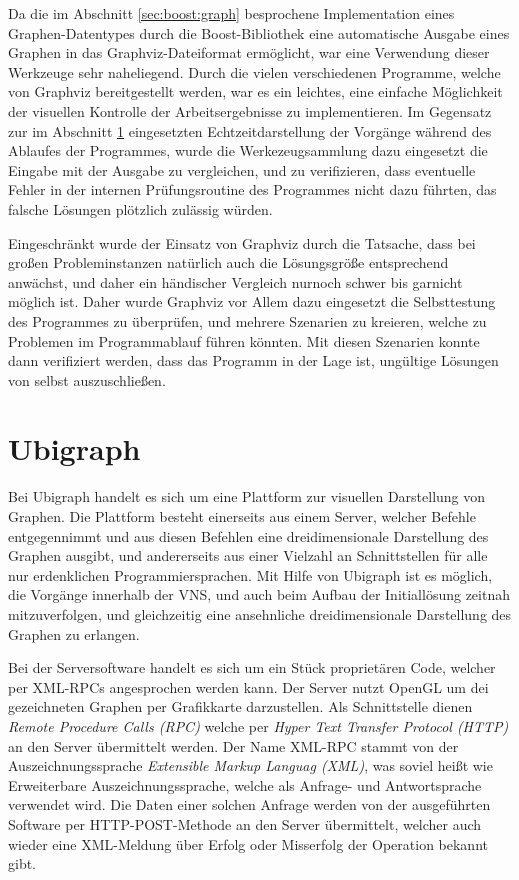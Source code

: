 Da die im Abschnitt \ref{sec:boost:graph} besprochene Implementation eines Graphen-Datentypes durch die Boost-Bibliothek eine automatische Ausgabe eines Graphen in das Graphviz-Dateiformat er\-möglicht, war 
eine Verwendung dieser Werkzeuge sehr naheliegend. Durch die vielen verschiedenen Programme, welche von Graphviz bereitgestellt werden, war es ein leichtes, eine einfache Möglichkeit der visuellen Kontrolle
der Arbeitsergebnisse zu implementieren. Im Gegensatz zur im Abschnitt \ref{sec:ubigraph} eingesetzten Echtzeitdarstellung der Vorgänge während des Ablaufes der Programmes, wurde die Werkezeugsammlung dazu eingesetzt
die Eingabe mit der Ausgabe zu vergleichen, und zu verifizieren, dass eventuelle Fehler in der internen Prüfungsroutine des Programmes nicht dazu führten, das falsche Lösungen plötzlich zulässig würden. 

Eingeschränkt wurde der Einsatz von Graphviz durch die Tatsache, dass bei großen Probleminstanzen natürlich auch die Lösungsgröße entsprechend anwächst, und daher ein händischer Vergleich nurnoch schwer bis garnicht möglich
ist. Daher wurde Graphviz vor Allem dazu eingesetzt die Selbsttestung des Programmes zu überprüfen, und mehrere Szenarien zu kreieren, welche zu Problemen im Programmablauf führen könnten. Mit diesen Szenarien
konnte dann verifiziert werden, dass das Programm in der Lage ist, ungültige Lösungen von selbst auszuschließen.


\section{Ubigraph}
\label{sec:ubigraph}
Bei Ubigraph handelt es sich um eine Plattform zur visuellen Darstellung von Graphen. Die Plattform besteht einerseits aus einem Server, welcher Befehle entgegennimmt und aus diesen Befehlen eine 
dreidimensionale Darstellung des Graphen ausgibt, und andererseits aus einer Vielzahl an Schnittstellen für alle nur erdenklichen Programmiersprachen. Mit Hilfe von Ubigraph ist es möglich, die
Vorgänge innerhalb der VNS, und auch beim Aufbau der Initiallösung zeitnah mitzuverfolgen, und gleichzeitig eine ansehnliche dreidimensionale Darstellung des Graphen zu erlangen.

Bei der Serversoftware handelt es sich um ein Stück proprietären Code, welcher per XML-RPCs angesprochen werden kann. Der Server nutzt OpenGL um dei gezeichneten Graphen per Grafikkarte darzustellen. Als
Schnittstelle dienen \textit{Remote Procedure Calls (RPC)} welche per \textit{Hyper Text Transfer Protocol (HTTP)} an den Server übermittelt werden. Der Name XML-RPC stammt von der Auszeichnungssprache
\textit{Extensible Markup Languag (XML)}, was soviel heißt wie Erweiterbare Auszeichnungssprache, welche als Anfrage- und Antwortsprache verwendet wird. Die Daten einer solchen Anfrage werden von der
ausgeführten Software per HTTP-POST-Methode an den Server übermittelt, welcher auch wieder eine XML-Meldung über Erfolg oder Misserfolg der Operation bekannt gibt. 

